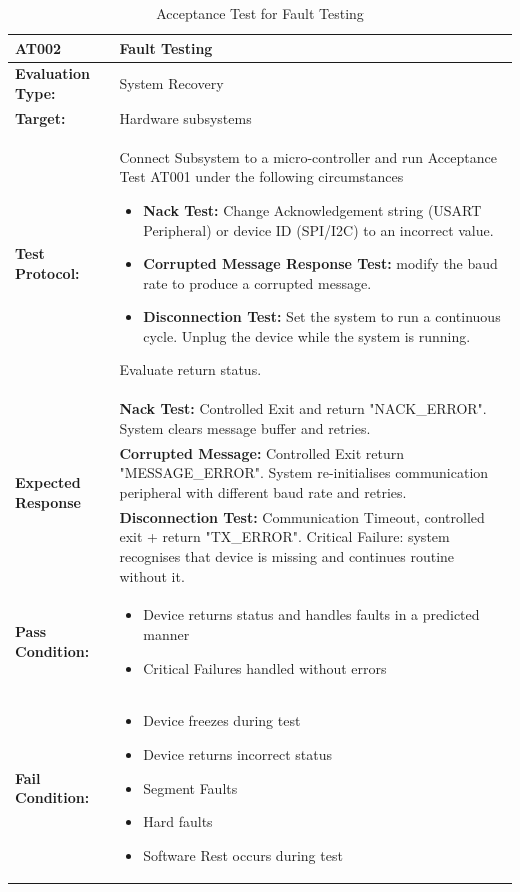 \begin{table}[H]
    \centering
    \caption{Acceptance Test for Fault Testing}
    \begin{tabular}{|m{}|m{}|}
    \hline
   
   \textbf{AT002 }& \textbf{Fault Testing} \\
     \hline
    \textbf{Evaluation Type:} & System Recovery\\
     \hline
    \textbf{Target: } & Hardware subsystems\\
    \hline
    \textbf{Test Protocol:} & Connect Subsystem to a micro-controller and run Acceptance Test AT001 under the following circumstances
    \begin{itemize}
        \item \textbf{Nack Test:} Change Acknowledgement string (USART Peripheral) or device ID (SPI/I2C) to an incorrect value.
        \item \textbf{Corrupted Message Response Test:} modify the baud rate to produce a corrupted message.
        \item \textbf{Disconnection Test:} Set the system to run a continuous cycle. Unplug the device while the system is running.

    \end{itemize} Evaluate return status. \\
    \hline
    \multirow{3}{*}{\textbf{Expected Response}} & \textbf{Nack Test: }  Controlled Exit and return "NACK\_ERROR". System clears message buffer and retries.\\ 
     \cline{2-2}
     & \textbf{Corrupted Message: } Controlled Exit return "MESSAGE\_ERROR". System re-initialises communication peripheral with different baud rate and retries.\\
    \cline{2-2}
    & \textbf{Disconnection Test: } Communication Timeout, controlled exit + return "TX\_ERROR". Critical Failure: system recognises that device is missing and continues routine without it.\\
     \hline
     \textbf{Pass Condition:} &\vspace{5pt} \begin{itemize}
        \item Device returns status and handles faults in a predicted manner  
        \item Critical Failures handled without errors
    \end{itemize} \\
    \hline
    \textbf{Fail Condition:} & \vspace{5pt} \begin{itemize}
        \item Device freezes during test
        \item Device returns incorrect status
        \item Segment Faults
        \item Hard faults
        \item Software Rest occurs during test
        \end{itemize}\\
        \hline
    \end{tabular}


\end{table}
